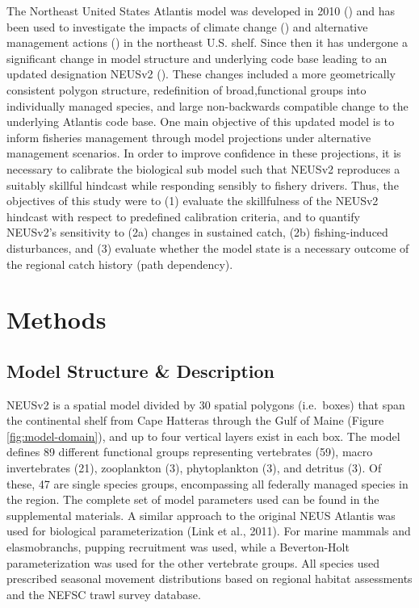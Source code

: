 \documentclass[
]{article}
\begin{document}
The Northeast United States Atlantis model was developed in 2010 () and has been used to investigate the impacts of climate change () and alternative management actions () in the northeast U.S. shelf. Since then it has undergone a significant change in model structure and underlying code base leading to an updated designation NEUSv2 (). These changes included a more geometrically consistent polygon structure, redefinition of broad,functional groups into individually managed species, and large non-backwards compatible change to the underlying Atlantis code base. One main objective of this updated model is to inform fisheries management through model projections under alternative management scenarios. In order to improve confidence in these projections, it is necessary to calibrate the biological sub model such that NEUSv2 reproduces a suitably skillful hindcast while responding sensibly to fishery drivers. Thus, the objectives of this study were to (1) evaluate the skillfulness of the NEUSv2 hindcast with respect to predefined calibration criteria, and to quantify NEUSv2's sensitivity to (2a) changes in sustained catch, (2b) fishing-induced disturbances, and (3) evaluate whether the model state is a necessary outcome of the regional catch history (path dependency).

\section{Methods}\label{methods}

\subsection{Model Structure \& Description}\label{model-structure-description}

NEUSv2 is a spatial model divided by 30 spatial polygons (i.e.~boxes) that span the continental shelf from Cape Hatteras through the Gulf of Maine (Figure \ref{fig:model-domain}), and up to four vertical layers exist in each box. The model defines 89 different functional groups representing vertebrates (59), macro invertebrates (21), zooplankton (3), phytoplankton (3), and detritus (3). Of these, 47 are single species groups, encompassing all federally managed species in the region. The complete set of model parameters used can be found in the supplemental materials. A similar approach to the original NEUS Atlantis was used for biological parameterization (Link et al., 2011). For marine mammals and elasmobranchs, pupping recruitment was used, while a Beverton-Holt parameterization was used for the other vertebrate groups. All species used prescribed seasonal movement distributions based on regional habitat assessments and the NEFSC trawl survey database.
\end{document}
